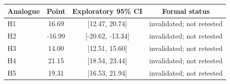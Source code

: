 \begin{tabular}{lccc}
\toprule
Analogue & Point & Exploratory 95\% CI & Formal status \\
\midrule
H1 & 16.69 & [12.47, 20.74] & invalidated; not retested \\
H2 & -16.99 & [-20.62, -13.34] & invalidated; not retested \\
H3 & 14.00 & [12.51, 15.60] & invalidated; not retested \\
H4 & 21.15 & [18.54, 23.44] & invalidated; not retested \\
H5 & 19.31 & [16.53, 21.94] & invalidated; not retested \\
\bottomrule
\end{tabular}
